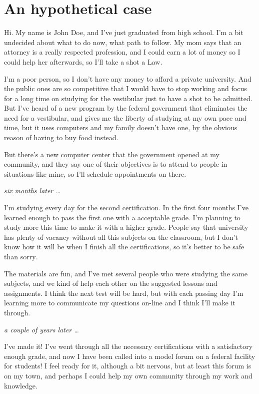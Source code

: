 \section{An hypothetical case}


Hi. My name is John Doe, and I've just graduated from high school. I'm a bit
undecided about what to do now, what path to follow. My mom  says that an
attorney is a really respected profession, and I could earn a lot of money so I
could help her afterwards, so I'll take a shot a Law.

I'm a poor person, so I don't have any money to afford a private university. And
the public ones are so competitive that I would have to stop working and focus
for a long time on studying for the vestibular just to have a shot to be
admitted. But I've heard of a new program by the federal government that
eliminates the need for a vestibular, and gives me the liberty of studying at my
own pace and time, but it uses computers and my family doesn't have one, by the
obvious reason of having to buy food instead.

But there's a new computer center that the government opened at my community,
and they say one of their objectives is to attend to people in situations like
mine, so I'll schedule appointments on there.

\textit{six months later \ldots }

I'm studying every day for the second certification. In the first four months
I've learned enough to pass the first one with a acceptable grade. I'm planning
to study more this time to make it with a higher grade. People say that
university has plenty of vacancy without all this subjects on the classroom, but
I don't know how it will be when I finish all the certifications, so it's better
to be safe than sorry.

The materials are fun, and I've met several people who were studying the same
subjects, and we kind of help each other on the suggested lessons and
assignments. I think the next test will be hard, but with each passing day I'm
learning more to communicate my questions on-line and I think I'll make it
through.

\textit{a couple of years later \ldots }

I've made it! I've went through all the necessary certifications with a
satisfactory enough grade, and now I have been called into a model forum on a
federal facility for students! I feel ready for it, although a bit nervous, 
but at least this forum is on my town, and perhaps I could help my own community
through my work and knowledge.

